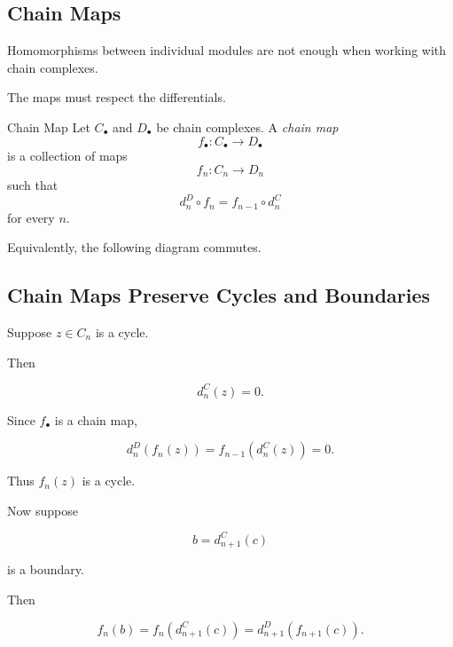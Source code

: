 \subsection{Chain Maps}
\label{subsec:chain-maps}

Homomorphisms between individual modules are not enough when working with
chain complexes.

The maps must respect the differentials.

\begin{definitionbox}{Chain Map}
Let \(C_\bullet\) and \(D_\bullet\) be chain complexes. A \emph{chain map}
\[ f_\bullet:C_\bullet\to D_\bullet \]
is a collection of maps
\[ f_n:C_n\to D_n \]
such that
\[ d_n^D\circ f_n=f_{n-1}\circ d_n^C \]
for every \(n\).
\end{definitionbox}

Equivalently, the following diagram commutes.

\begin{center}
\end{center}

\subsection{Chain Maps Preserve Cycles and Boundaries}
\label{subsec:chain-maps-cycles-boundaries}

Suppose \(z\in C_n\) is a cycle.

Then

\[ d_n^C(z)=0. \]

Since \(f_\bullet\) is a chain map,

\[ d_n^D(f_n(z))=f_{n-1}(d_n^C(z))=0. \]

Thus \(f_n(z)\) is a cycle.

Now suppose

\[ b=d_{n+1}^C(c) \]

is a boundary.

Then

\[ f_n(b)=f_n(d_{n+1}^C(c))
=d_{n+1}^D(f_{n+1}(c)). \]

